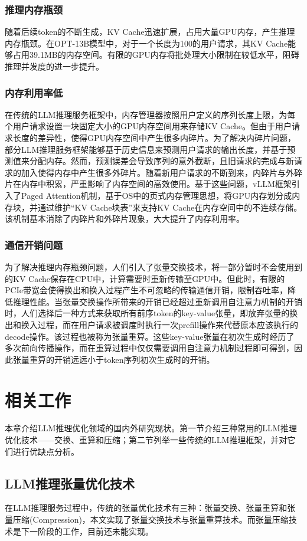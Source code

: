 \documentclass[a4paper, nosysfonts]{hpcchina}
\begin{document}
\subsubsection{推理内存瓶颈}
随着后续token的不断生成，KV Cache迅速扩展，占用大量GPU内存，产生推理内存瓶颈。在OPT-13B模型中，对于一个长度为100的用户请求，其KV Cache能够占用39.1MB的内存空间。有限的GPU内存将批处理大小限制在较低水平，阻碍推理并发度的进一步提升。
\subsubsection{内存利用率低}
在传统的LLM推理服务框架中，内存管理器按照用户定义的序列长度上限，为每个用户请求设置一块固定大小的GPU内存空间用来存储KV Cache。但由于用户请求长度的差异性，使得GPU内存空间中产生很多内碎片。为了解决内碎片问题，部分LLM推理服务框架能够基于历史信息来预测用户请求的输出长度，并基于预测值来分配内存。然而，预测误差会导致序列的意外截断，且旧请求的完成与新请求的加入使得内存中产生很多外碎片。随着新用户请求的不断到来，内碎片与外碎片在内存中积累，严重影响了内存空间的高效使用。基于这些问题，vLLM框架引入了Paged Attention机制，基于OS中的页式内存管理思想，将GPU内存划分成内存块，并通过维护“KV Cache块表”来支持KV Cache在内存空间中的不连续存储。该机制基本消除了内碎片和外碎片现象，大大提升了内存利用率。 
\subsubsection{通信开销问题}
为了解决推理内存瓶颈问题，人们引入了张量交换技术，将一部分暂时不会使用到的KV Cache保存在CPU中，计算需要时重新传输至GPU中。但此时，有限的PCIe带宽会使得换出和换入过程产生不可忽略的传输通信开销，限制吞吐率，降低推理性能。当张量交换操作所带来的开销已经超过重新调用自注意力机制的开销时，人们选择后一种方式来获取所有前序token的key-value张量，即放弃张量的换出和换入过程，而在用户请求被调度时执行一次prefill操作来代替原本应该执行的decode操作。该过程也被称为张量重算。这些key-value张量在初次生成时经历了多次前向传播操作，而在重算过程中仅仅需要调用自注意力机制过程即可得到，因此张量重算的开销远远小于token序列初次生成时的开销。

\section{相关工作}
本章介绍LLM推理优化领域的国内外研究现状。第一节介绍三种常用的LLM推理优化技术——交换、重算和压缩；第二节列举一些传统的LLM推理框架，并对它们进行优缺点分析。

\subsection{LLM推理张量优化技术}
在LLM推理服务过程中，传统的张量优化技术有三种：张量交换、张量重算和张量压缩(Compression)，本文实现了张量交换技术与张量重算技术。而张量压缩技术是下一阶段的工作，目前还未能实现。
\end{document}
